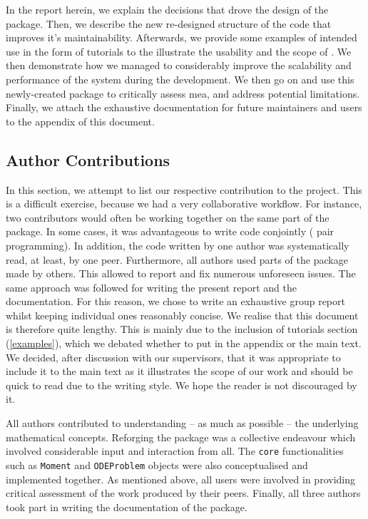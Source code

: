 In the report herein, we explain the decisions that drove the design of the package.
Then, we describe the new re-designed structure of the code that improves it's maintainability.
Afterwards, we provide some examples of intended use in the form of tutorials to the illustrate the usability and the scope of \means.
We then demonstrate how we managed to considerably improve the scalability and performance of the system during the development.
We then go on and use this newly-created package to critically assess \gls{mea}, and address potential limitations.
Finally, we attach the exhaustive documentation for future maintainers and users to the appendix of this document.

\subsection{Author Contributions}
In this section, we attempt to list our respective contribution to the project.
This is a difficult exercise, because we had a very collaborative workflow.
For instance,  two contributors would often be working together on the same part of the package.
In some cases, it was advantageous to write code conjointly (\ie{} pair programming).
In addition, the code written by one author was systematically read, at least, by one peer.
Furthermore,  all authors used  parts of the package made by others.
This allowed to report and fix numerous unforeseen issues.
The same approach was followed for writing the present report and the documentation.
For this reason, we chose to write an exhaustive group report whilst keeping individual ones reasonably concise. 
We realise that this document is therefore quite lengthy.
This is mainly due to the inclusion of tutorials section (\autoref{examples}),
which we debated whether to put in the appendix or the main text. 
We decided, after discussion with our supervisors, that it was appropriate to include it to the main text as it illustrates the scope of our work and should be quick to read due to the writing style. We hope the reader is not discouraged by it.

All authors contributed to understanding -- as much as possible -- the underlying mathematical concepts.
Reforging the package was a collective endeavour which involved considerable input and interaction from all.
The \texttt{core} functionalities such as \texttt{Moment} and \texttt{ODEProblem} objects were also conceptualised and implemented together.  
As mentioned above, all users were involved in providing critical assessment of the work produced by their peers.
Finally, all three authors took part in writing the documentation of the package.

